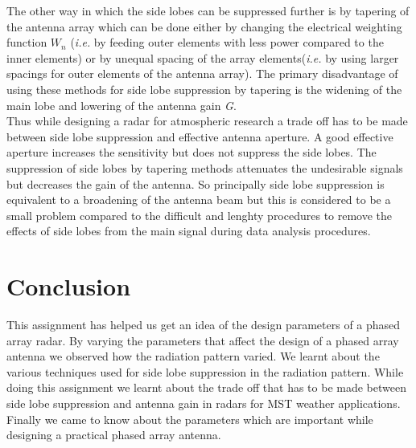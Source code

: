 \documentclass{article}
\begin{document}
The other way in which the side lobes can be suppressed further is by tapering of the antenna array which can be done either by changing the electrical weighting function $W_n$ (\textit{i.e.} by feeding outer elements with less power compared to the inner elements) or by unequal spacing of the array elements(\textit{i.e.} by using larger spacings for outer elements of the antenna array). The primary disadvantage of using these methods for side lobe suppression by tapering is the widening of the main lobe and lowering of the antenna gain \textit{G}.\cite{Rottger:2000ip}\\

Thus while designing a radar for atmospheric research a trade off has to be made between side lobe suppression and effective antenna aperture. A good effective aperture increases the sensitivity but does not suppress the side lobes. The suppression of side lobes by tapering methods attenuates the undesirable signals but decreases the gain of the antenna. So principally side lobe suppression is equivalent to a broadening of the antenna beam but this is considered to be a small problem compared to the difficult and lenghty procedures to remove the effects of side lobes from the main signal during data analysis procedures.\cite{Rottger:2000ip}\\


\section{Conclusion}

This assignment has helped us get an idea of the design parameters of a phased array radar.
By varying the parameters that affect the design of a phased array antenna we observed how the radiation pattern varied. We learnt about the various techniques used for side lobe suppression in the radiation pattern. While doing this assignment we learnt about the trade off that has to be made between side lobe suppression and antenna gain in radars for MST weather applications. Finally we came to know about the parameters which are important while designing a practical phased array antenna.
\end{document}
